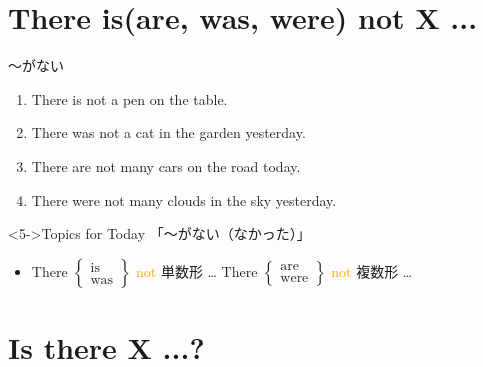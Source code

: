 \documentclass[aspectratio=169]{beamer}
\newcommand{\myaudio}[1]{\href{#1}{\faVolumeUp}}
\begin{document}
\section{There is(are, was, were) not X ...}
\begin{frame}[plain]{〜がない}

\begin{enumerate}[<+->]
 \item There is not a pen on the table.
 \item There was not a cat in the garden yesterday.
 \item There are not many cars on the road today.
 \item There were not many clouds in the sky yesterday.
\end{enumerate}

\pause 
\begin{exampleblock}<5->{Topics for Today}
「〜がない（なかった）」
\begin{itemize}
 \item There $\left\{\begin{array}{l}\text{is}\\\text{was}\end{array}
\right\}$ \textcolor{orange}{not} 単数形 \ldots\hspace{40pt}\pause
There $\left\{\begin{array}{l}\text{are}\\\text{were}\end{array}
\right\}$ \textcolor{orange}{not} 複数形 \ldots
\end{itemize}
\end{exampleblock}

\hfill\myaudio{./audio/001_there_is_05.mp3}
\end{frame}

\section{Is there X ...?}
\end{document}

